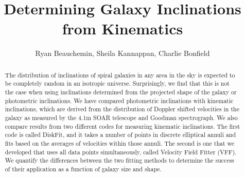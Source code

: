 \documentclass{emulateapj}
\begin{document}

\title{Determining Galaxy Inclinations from Kinematics}


\author{Ryan Beauchemin, Sheila Kannappan, Charlie Bonfield}






\begin{abstract}
The distribution of inclinations of spiral galaxies in any area in the sky is expected to be completely random in an isotropic universe. Surprisingly, we find that this is not the case when using inclinations determined from the projected shape of the galaxy or photometric inclinations. We have compared photometric inclinations with kinematic inclinations, which are derived from the distribution of Doppler shifted velocities in the galaxy as measured by the 4.1m SOAR telescope and Goodman spectrograph. We also compare results from two different codes for measuring kinematic inclinations. The first code is called DiskFit, and it takes a number of points in discrete elliptical annuli and fits based on the averages of velocities within those annuli. The second is one that we developed that uses all data points simultaneously, called Velocity Field Fitter (VFF). We quantify the differences between the two fitting methods to determine the success of their application as a function of galaxy size and shape. 
\end{abstract}
\end{document}
